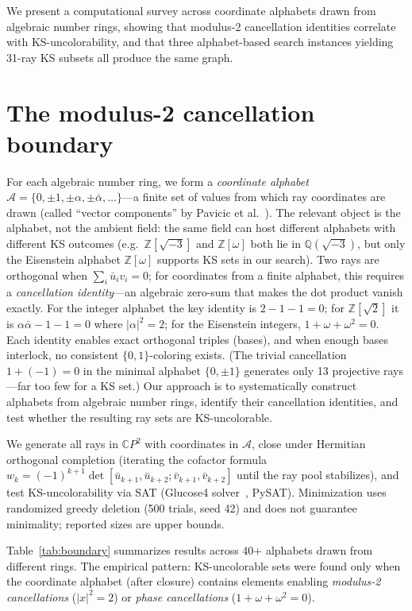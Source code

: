 \documentclass[twocolumn,prl,superscriptaddress,nofootinbib]{revtex4-2}
\newcommand{\C}{\mathbb{C}}
\newcommand{\Z}{\mathbb{Z}}
\newcommand{\Q}{\mathbb{Q}}
\begin{document}
We present a computational survey across coordinate alphabets drawn from algebraic number rings, showing that modulus-2 cancellation identities correlate with KS-uncolorability, and that three alphabet-based search instances yielding 31-ray KS subsets all produce the same graph.

\section{The modulus-2 cancellation boundary}

For each algebraic number ring, we form a \emph{coordinate alphabet} $\mathcal{A} = \{0, \pm 1, \pm\alpha, \pm\bar\alpha, \ldots\}$---a finite set of values from which ray coordinates are drawn (called ``vector components'' by Pavicic et al.~\cite{Pavicic2019}).  The relevant object is the alphabet, not the ambient field: the same field can host different alphabets with different KS outcomes (e.g.\ $\Z[\sqrt{-3}]$ and $\Z[\omega]$ both lie in $\Q(\sqrt{-3})$, but only the Eisenstein alphabet $\Z[\omega]$ supports KS sets in our search).  Two rays are orthogonal when $\sum_i \bar{u}_i v_i = 0$; for coordinates from a finite alphabet, this requires a \emph{cancellation identity}---an algebraic zero-sum that makes the dot product vanish exactly.  For the integer alphabet the key identity is $2 - 1 - 1 = 0$; for $\Z[\sqrt{2}]$ it is $\alpha\bar\alpha - 1 - 1 = 0$ where $|\alpha|^2 = 2$; for the Eisenstein integers, $1+\omega+\omega^2=0$.  Each identity enables exact orthogonal triples (bases), and when enough bases interlock, no consistent $\{0,1\}$-coloring exists.  (The trivial cancellation $1+(-1)=0$ in the minimal alphabet $\{0,\pm 1\}$ generates only 13 projective rays---far too few for a KS set.)  Our approach is to systematically construct alphabets from algebraic number rings, identify their cancellation identities, and test whether the resulting ray sets are KS-uncolorable.

We generate all rays in $\C P^2$ with coordinates in $\mathcal{A}$, close under Hermitian orthogonal completion (iterating the cofactor formula $w_k = (-1)^{k+1}\det[\bar{u}_{k+1},\bar{u}_{k+2};\bar{v}_{k+1},\bar{v}_{k+2}]$ until the ray pool stabilizes), and test KS-uncolorability via SAT (Glucose4 solver~\cite{AudemardSimon2018}, PySAT). Minimization uses randomized greedy deletion (500 trials, seed 42) and does not guarantee minimality; reported sizes are upper bounds.

Table~\ref{tab:boundary} summarizes results across 40+ alphabets drawn from different rings. The empirical pattern: KS-uncolorable sets were found only when the coordinate alphabet (after closure) contains elements enabling \emph{modulus-2 cancellations} ($|x|^2 = 2$) or \emph{phase cancellations} ($1 + \omega + \omega^2 = 0$).
\end{document}
